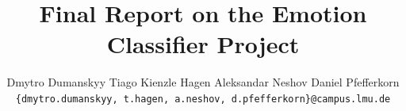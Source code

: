 \documentclass[10pt, letterpaper, twocolumn]{article}
\title{Final Report on the Emotion Classifier Project}
\author{Dmytro Dumanskyy
\quad
Tiago Kienzle Hagen
\quad
Aleksandar Neshov
\quad
Daniel Pfefferkorn\\
\tt\small\{dmytro.dumanskyy, t.hagen, a.neshov, d.pfefferkorn\}@campus.lmu.de}
\begin{document}
\maketitle








\newpage
\appendix




{
    \small
    
    
}
\end{document}
